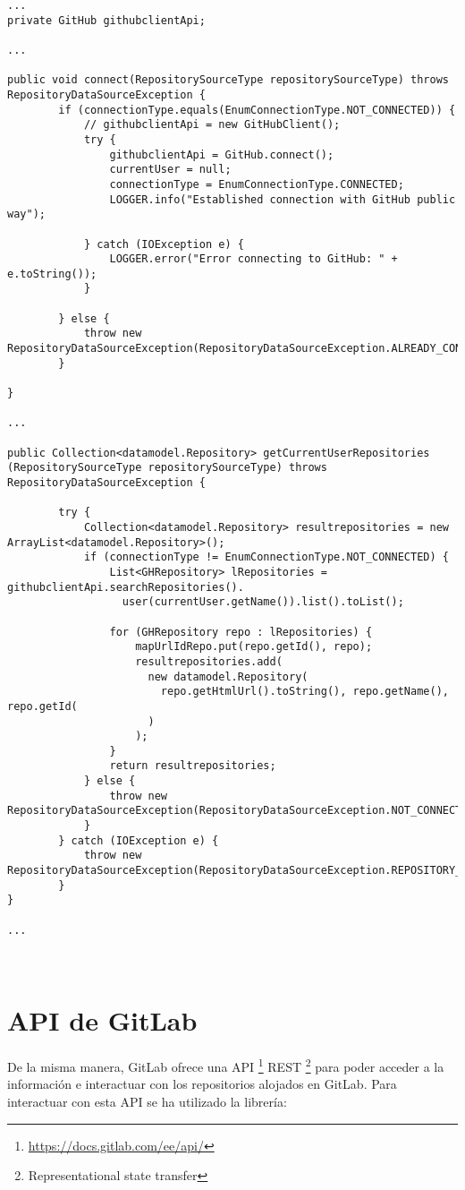 \begin{minipage}{\linewidth}
{\tiny
\begin{verbatim}
...
private GitHub githubclientApi;

...

public void connect(RepositorySourceType repositorySourceType) throws RepositoryDataSourceException {
		if (connectionType.equals(EnumConnectionType.NOT_CONNECTED)) {
			// githubclientApi = new GitHubClient();
			try {
				githubclientApi = GitHub.connect();
				currentUser = null;
				connectionType = EnumConnectionType.CONNECTED;
				LOGGER.info("Established connection with GitHub public way");

			} catch (IOException e) {
				LOGGER.error("Error connecting to GitHub: " + e.toString());
			}

		} else {
			throw new RepositoryDataSourceException(RepositoryDataSourceException.ALREADY_CONNECTED);
		}

}

...

public Collection<datamodel.Repository> getCurrentUserRepositories
(RepositorySourceType repositorySourceType)	throws RepositoryDataSourceException {

		try {
			Collection<datamodel.Repository> resultrepositories = new ArrayList<datamodel.Repository>();
			if (connectionType != EnumConnectionType.NOT_CONNECTED) {
				List<GHRepository> lRepositories = githubclientApi.searchRepositories().
				  user(currentUser.getName()).list().toList();

				for (GHRepository repo : lRepositories) {
					mapUrlIdRepo.put(repo.getId(), repo);
					resultrepositories.add(
					  new datamodel.Repository(
					    repo.getHtmlUrl().toString(), repo.getName(), repo.getId(
					  )
					);
				}
				return resultrepositories;
			} else {
				throw new RepositoryDataSourceException(RepositoryDataSourceException.NOT_CONNECTED);
			}
		} catch (IOException e) {
			throw new RepositoryDataSourceException(RepositoryDataSourceException.REPOSITORY_NOT_FOUND);
		}
}

...
\end{verbatim}
}
\end{minipage}\\

\newpage
\section{API de GitLab}

De la misma manera, GitLab ofrece una API \footnote{\url{https://docs.gitlab.com/ee/api/}} REST \footnote{Representational state transfer} para poder acceder a la información e interactuar con los repositorios alojados en GitLab. Para interactuar con esta API se ha utilizado la librería:\\

